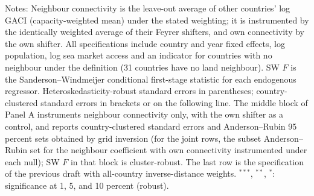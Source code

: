\documentclass[12pt]{article}
\begin{document}
\begin{table}[htbp]
\begin{threeparttable}
\begin{tablenotes}[flushleft]
\item Notes: Neighbour connectivity is the leave-out average of other countries' log GACI (capacity-weighted mean) under the stated weighting; it is instrumented by the identically weighted average of their Feyrer shifters, and own connectivity by the own shifter. All specifications include country and year fixed effects, log population, log sea market access and an indicator for countries with no neighbour under the definition (31 countries have no land neighbour). SW $F$ is the Sanderson--Windmeijer conditional first-stage statistic for each endogenous regressor. Heteroskedasticity-robust standard errors in parentheses; country-clustered standard errors in brackets or on the following line. The middle block of Panel A instruments neighbour connectivity only, with the own shifter as a control, and reports country-clustered standard errors and Anderson--Rubin 95 percent sets obtained by grid inversion (for the joint rows, the subset Anderson--Rubin set for the neighbour coefficient with own connectivity instrumented under each null); SW $F$ in that block is cluster-robust. The last row is the specification of the previous draft with all-country inverse-distance weights. $^{***}$, $^{**}$, $^{*}$: significance at 1, 5, and 10 percent (robust).
\end{tablenotes}
\end{threeparttable}
\end{table}
\end{document}
